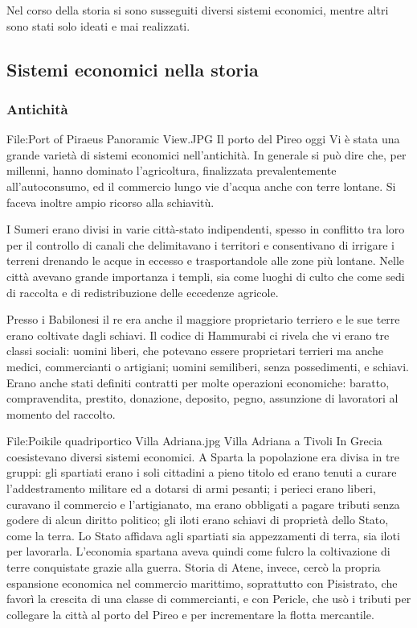 Nel corso della storia si sono susseguiti diversi sistemi economici, mentre 
altri sono stati solo ideati e mai realizzati.

\subsection{Sistemi economici nella storia}

\subsubsection{Antichità}

File:Port of Piraeus Panoramic View.JPG Il porto del Pireo oggi
Vi è stata una grande varietà di sistemi economici nell'antichità. In generale 
si può dire che, per millenni, hanno dominato l'agricoltura, finalizzata 
prevalentemente all'autoconsumo, ed il commercio lungo vie d'acqua anche con 
terre lontane. Si faceva inoltre ampio ricorso alla schiavitù.

I Sumeri erano divisi in varie città-stato indipendenti, spesso in 
conflitto tra loro per il controllo di canali che 
delimitavano i territori e consentivano di irrigare i terreni drenando le acque 
in eccesso e trasportandole alle zone più lontane. Nelle città avevano grande 
importanza i templi, sia come luoghi di culto che come sedi di 
raccolta e di redistribuzione delle eccedenze agricole.

Presso i Babilonesi il re era anche il maggiore 
proprietario terriero e le sue terre erano coltivate dagli schiavi. Il codice 
di Hammurabi ci rivela che vi erano tre classi sociali: uomini liberi, che 
potevano essere proprietari terrieri ma anche medici, commercianti o artigiani; 
uomini semiliberi, senza possedimenti, e schiavi. Erano anche stati definiti 
contratti per molte operazioni economiche: baratto, 
compravendita, prestito, donazione, deposito, pegno, 
assunzione di lavoratori al momento del raccolto.

File:Poikile quadriportico Villa Adriana.jpg Villa Adriana a 
Tivoli
In Grecia coesistevano diversi sistemi economici. A Sparta la 
popolazione era divisa in tre gruppi: gli spartiati erano i soli cittadini a 
pieno titolo ed erano tenuti a curare l'addestramento militare ed a dotarsi di 
armi pesanti; i perieci erano liberi, curavano il commercio e l'artigianato, ma 
erano obbligati a pagare tributi senza godere di alcun diritto politico; gli 
iloti erano schiavi di proprietà dello Stato, come la terra. Lo Stato affidava 
agli spartiati sia appezzamenti di terra, sia iloti per lavorarla. L'economia 
spartana aveva quindi come fulcro la coltivazione di terre conquistate grazie 
alla guerra. Storia di Atene, invece, cercò la propria espansione 
economica nel commercio marittimo, soprattutto con Pisistrato, che favorì 
la crescita di una classe di commercianti, e con Pericle, che usò i tributi 
per collegare la città al porto del Pireo e per incrementare la flotta 
mercantile.

